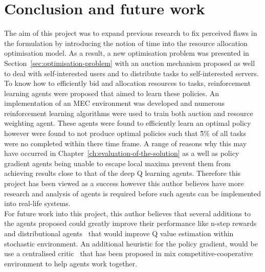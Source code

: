 \chapter{Conclusion and future work}\label{ch:conclusion-and-future-work}
The aim of this project was to expand previous research to fix perceived flaws in the formulation by introducing the
notion of time into the resource allocation optimisation model. As a result, a new optimisation problem was presented
in Section~\ref{sec:optimisation-problem} with an auction mechanism proposed as well to deal with self-interested
users and to distribute tasks to self-interested servers. To know how to efficiently bid and allocation resources to
tasks, reinforcement learning agents were proposed that aimed to learn these policies. An implementation of an MEC
environment was developed and numerous reinforcement learning algorithms were used to train both auction and resource
weighting agent. These agents were found to efficiently learn an optimal policy however were found to not produce
optimal policies such that \~5\% of all tasks were no completed within there time frame. A range of reasons why this
may have occurred in Chapter~\ref{ch:evaluation-of-the-solution} as a well as policy gradient agents being unable to
escape local maxima prevent them from achieving results close to that of the deep Q learning agents. Therefore this
project has been viewed as a success however this author believes have more research and analysis of agents is required
before such agents can be implemented into real-life systems. \\
For future work into this project, this author believes that several additions to the agents proposed could greatly
improve their performance like n-step rewards~\citep{multi-step-dqn} and distributional agents~\citep{distributional_dqn}
that would improve Q value estimation within stochastic environment. An additional heuristic for the policy gradient,
would be use a centralised critic~\citep{maddpg} that has been proposed in mix competitive-cooperative environment to
help agents work together.
